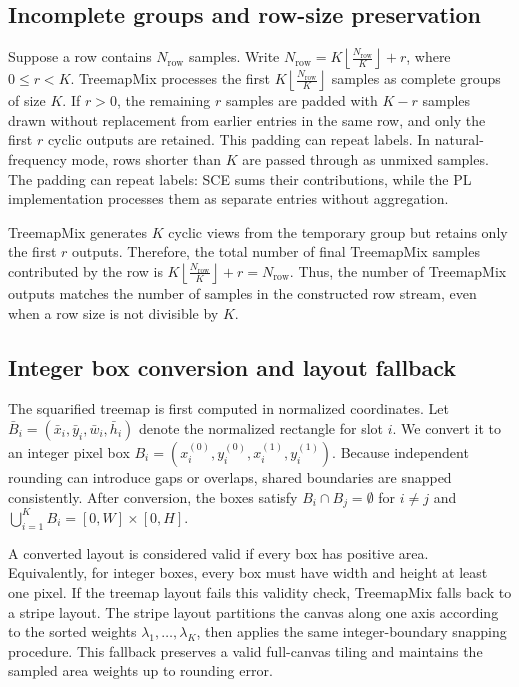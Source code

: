 \subsection{Incomplete groups and row-size preservation}

Suppose a row contains $N_{\mathrm{row}}$ samples. Write \(N_{\mathrm{row}}=K\left\lfloor\frac{N_{\mathrm{row}}}{K}\right\rfloor+r\), where \(0\le r<K\). TreemapMix processes the first \(K\left\lfloor\frac{N_{\mathrm{row}}}{K}\right\rfloor\)
samples as complete groups of size $K$. If $r>0$, the remaining $r$ samples are padded with $K-r$ samples drawn without replacement from earlier entries in the same row, and only the first $r$ cyclic outputs are retained. This padding can repeat labels. In natural-frequency mode, rows shorter than $K$ are passed through as unmixed samples. The padding can repeat labels: SCE sums their contributions, while the PL implementation processes them as separate entries without aggregation.

TreemapMix generates $K$ cyclic views from the temporary group but retains only the first $r$ outputs. Therefore, the total number of final TreemapMix samples contributed by the row is \(K\left\lfloor\frac{N_{\mathrm{row}}}{K}\right\rfloor+r=N_{\mathrm{row}}\).
Thus, the number of TreemapMix outputs matches the number of samples in the constructed row stream, even when a row size is not divisible by $K$.

\subsection{Integer box conversion and layout fallback}

The squarified treemap is first computed in normalized coordinates. Let \(\bar{B}_i=(\bar{x}_i,\bar{y}_i,\bar{w}_i,\bar{h}_i)\) denote the normalized rectangle for slot $i$. We convert it to an integer pixel box \(B_i=(x_i^{(0)},y_i^{(0)},x_i^{(1)},y_i^{(1)})\). Because independent rounding can introduce gaps or overlaps, shared boundaries are snapped consistently. After conversion, the boxes satisfy \(B_i\cap B_j=\emptyset\) for \(i\neq j\) and \(\bigcup_{i=1}^{K}B_i=[0,W]\times[0,H]\).

A converted layout is considered valid if every box has positive area. Equivalently, for integer boxes, every box must have width and height at least one pixel. If the treemap layout fails this validity check, TreemapMix falls back to a stripe layout. The stripe layout partitions the canvas along one axis according to the sorted weights $\lambda_1,\dots,\lambda_K$, then applies the same integer-boundary snapping procedure. This fallback preserves a valid full-canvas tiling and maintains the sampled area weights up to rounding error.

